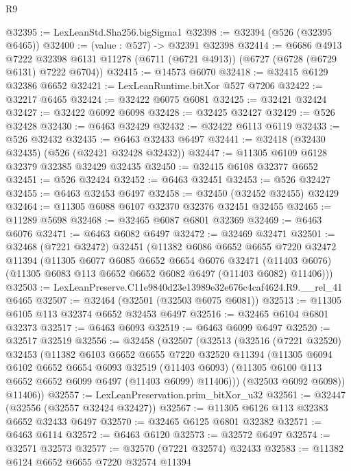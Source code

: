 \begin{lexlean}{R9}
\begin{coremodule}
@32395 := LexLeanStd.Sha256.bigSigma1
@32398 := @32394 (@526 (@32395 @6465))
@32400 := (value : @527) -> @32391 @32398
@32414 := @6686
    @4913
    @7222
    @32398
    @6131
    @11278
    (@6711 (@6721 @4913))
    (@6727 (@6728 (@6729 @6131) @7222 @6704))
@32415 := @14573 @6070
@32418 := @32415 @6129 @32386 @6652
@32421 := LexLeanRuntime.bitXor @527 @7206
@32422 := @32217 @6465
@32424 := @32422 @6075 @6081
@32425 := @32421 @32424
@32427 := @32422 @6092 @6098
@32428 := @32425 @32427
@32429 := @526 @32428
@32430 := @6463 @32429
@32432 := @32422 @6113 @6119
@32433 := @526 @32432
@32435 := @6463 @32433 @6497
@32441 := @32418 (@32430 @32435) (@526 (@32421 @32428 @32432))
@32447 := @11305 @6109 @6128 @32379 @32385 @32429 @32435
@32450 := @32415 @6108 @32377 @6652
@32451 := @526 @32424
@32452 := @6463 @32451
@32453 := @526 @32427
@32455 := @6463 @32453 @6497
@32458 := @32450 (@32452 @32455) @32429
@32464 := @11305 @6088 @6107 @32370 @32376 @32451 @32455
@32465 := @11289 @5698
@32468 := @32465 @6087 @6801 @32369
@32469 := @6463 @6076
@32471 := @6463 @6082 @6497
@32472 := @32469 @32471
@32501 := @32468
    (@7221 @32472)
    @32451
    (@11382
      @6086
      @6652
      @6655
      @7220
      @32472
      @11394
      (@11305
        @6077
        @6085
        @6652
        @6654
        @6076
        @32471
        (@11403 @6076)
        (@11305 @6083 @113 @6652 @6652 @6082 @6497 (@11403 @6082) @11406)))
@32503 := LexLeanPreserve.C11e9840d23e13989e32e676c4caf4624.R9.__rel_41 @6465
@32507 := @32464 (@32501 (@32503 @6075 @6081))
@32513 := @11305 @6105 @113 @32374 @6652 @32453 @6497
@32516 := @32465 @6104 @6801 @32373
@32517 := @6463 @6093
@32519 := @6463 @6099 @6497
@32520 := @32517 @32519
@32556 := @32458
    (@32507
      (@32513
        (@32516
          (@7221 @32520)
          @32453
          (@11382
            @6103
            @6652
            @6655
            @7220
            @32520
            @11394
            (@11305
              @6094
              @6102
              @6652
              @6654
              @6093
              @32519
              (@11403 @6093)
              (@11305 @6100 @113 @6652 @6652 @6099 @6497 (@11403 @6099) @11406)))
          (@32503 @6092 @6098))
        @11406))
@32557 := LexLeanPreservation.prim_bitXor_u32
@32561 := @32447 (@32556 (@32557 @32424 @32427))
@32567 := @11305 @6126 @113 @32383 @6652 @32433 @6497
@32570 := @32465 @6125 @6801 @32382
@32571 := @6463 @6114
@32572 := @6463 @6120
@32573 := @32572 @6497
@32574 := @32571 @32573
@32577 := @32570 (@7221 @32574) @32433
@32583 := @11382 @6124 @6652 @6655 @7220 @32574 @11394

\end{coremodule}
\end{lexlean}
